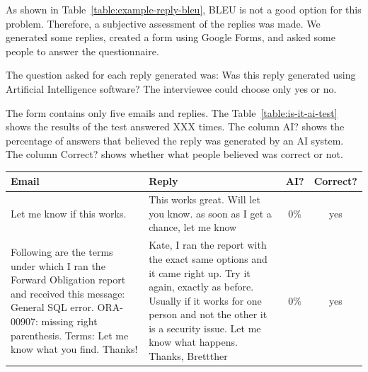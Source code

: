 \documentclass[letterpaper]{article}
\begin{document}
As shown in Table~\ref{table:example-reply-bleu}, BLEU is not a good option for this problem. Therefore, a subjective assessment of the replies was made. We generated some replies, created a form using Google Forms, and asked some people to answer the questionnaire.

The question asked for each reply generated was: Was this reply generated using Artificial Intelligence software? The interviewee could choose only yes or no.

The form contains only five emails and replies. The Table~\ref{table:is-it-ai-test} shows the results of the test answered XXX times. The column AI? shows the percentage of answers that believed the reply was generated by an AI system. The column Correct? shows whether what people believed was correct or not.

\begin{table}[ht]
    \centering
    \begin{tabularx}{\textwidth}{|X|X|c|c|}
        \hline
        \textbf{Email}                                                                                                                                                                                        & \textbf{Reply}                                                                                                                                                                                                                     & \textbf{AI?} & \textbf{Correct?} \\
        \hline
        Let me know if this works.                                                                                                                                                                            & This works great. Will let you know. as soon as I get a chance, let me know                                                                                                                                                        & \num{0}{\%}  & yes               \\
        \hline
        Following are the terms under which I ran the Forward Obligation report and received this message: General SQL error. ORA-00907: missing right parenthesis. Terms: Let me know what you find. Thanks! & Kate, I ran the report with the exact same options and it came right up. Try it again, exactly as before. Usually if it works for one person and not the other it is a security issue. Let me know what happens. Thanks, Brettther & \num{0}{\%}  & yes               \\

\end{tabularx}
\end{table}
\end{document}
